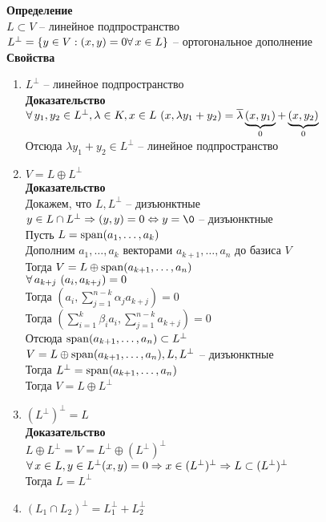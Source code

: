\documentclass[12pt]{article}
\begin{document}
\textbf{Определение}\\
$L \subset V$ -- линейное подпространство\\
$L^\perp = \{y \in V: (x,y) = 0 \fall x \in L\}$ -- ортогональное дополнение\\
\textbf{Свойства}
\begin{enumerate}
    \item $L^\perp$ -- линейное подпространство\\
    \textbf{Доказательство}\\
    $\fall y_1, y_2 \in L^\perp, \lambda \in K, x \in L\ (x,\lambda y_1 + y_2) = \ol\lambda\ub{0}{(x,y_1)} + \ub{0}{(x, y_2)}$\\
    Отсюда $\lambda y_1 + y_2 \in L^\perp$ -- линейное подпространство
    \item $V = L \oplus L^\perp$\\
    \textbf{Доказательство}\\
    Докажем, что $L, L^\perp$ -- дизъюнктные\\
    $y \in L \cap L^\perp \Rto (y, y)=0 \LRto y = \0$ -- дизъюнктные\\
    Пусть $L = \span(a_1, \ldots, a_k)$\\
    Дополним $a_1,\ldots, a_k$ векторами $a_{k+1}, \ldots, a_n$ до базиса $V$\\
    Тогда $V = L \oplus \span(a_{k+1},\ldots, a_n)$\\
    $\fall a_{k+j}\ (a_i, a_{k+j}) = 0$\\
    Тогда $(a_i, \sum_{j=1}^{n-k} \alpha_j a_{k+j}) = 0$\\
    Тогда $(\sum_{i = 1}^k \beta_i a_i, \sum_{j=1}^{n-k} a_{k+j}) = 0$\\
    Отсюда $\span(a_{k+1}, \ldots, a_n) \subset L^\perp$\\
    $V = L \oplus \span(a_{k+1}, \ldots, a_n), L, L^\perp$ -- дизъюнктные\\
    Тогда $L^\perp = \span(a_{k+1},\ldots, a_n)$\\
    Тогда $V = L \oplus L^\perp$
    \item $(L^\perp)^\perp = L$\\
    \textbf{Доказательство}\\
    $L\oplus L^\perp = V = L^\perp \oplus (L^\perp)^\perp$\\
    $\fall x \in L, y \in L^\perp (x, y) = 0 \Rto x \in (L^\perp)^\perp \Rto L \subset (L^\perp)^\perp$\\
    Тогда $L = L^\perp$
    \item $(L_1 \cap L_2)^\perp = L_1^\perp + L_2^\perp$\\

\end{enumerate}
\end{document}
